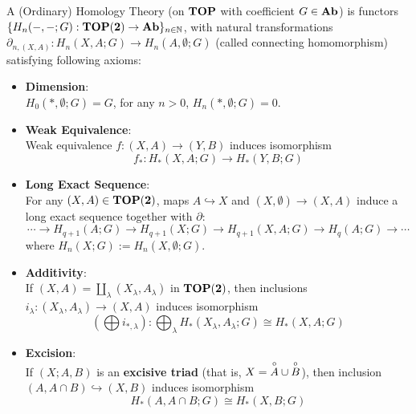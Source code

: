     \begin{defn}
        \label{hyp:Ordinary-Homology-Theory}
        A (Ordinary) Homology Theory (on $\mathbf{TOP}$ with coefficient $G \in \mathbf{Ab}$) is
        functors $\{H_n(-,-;G) : \mathbf{TOP(2)} \to \mathbf{Ab}\}_{n \in \mathbb N}$,
        with natural transformations ${\partial_{n,(X,A)} : H_n(X,A;G) \to H_n(A,\emptyset;G)}$
        (called connecting homomorphism)\\
        satisfying following axioms:\\
        \begin{itemize}
            \item \textbf{Dimension}:\\
                $H_0 (\ast, \emptyset;G) = G$,
                for any $n > 0$, $H_n (\ast, \emptyset;G) = 0$.\\
            \item \textbf{Weak Equivalence}:\\
                Weak equivalence $f : (X,A) \to (Y,B)$
                induces isomorphism
                $$
                f_* : H_*(X,A;G) \to H_*(Y,B;G)
                $$
            \item \textbf{Long Exact Sequence}:\\
                For any $(X,A) \in \mathbf{TOP(2)}$, maps $A \hookrightarrow X$
                and $(X,\emptyset) \to (X,A)$ induce a long exact sequence together
                with $\partial$:
                $$
                \cdots \to H_{q+1}(A;G) \to H_{q+1}(X;G) \to H_{q+1}(X,A;G) \to H_q(A;G) \to \cdots
                $$
                where $H_n(X;G) := H_n(X,\emptyset;G)$.\\
            \item \textbf{Additivity}:\\
                If $(X,A) = \coprod_\lambda (X_\lambda, A_\lambda) $ in $\mathbf{TOP(2)}$,
                then inclusions $i_\lambda : (X_\lambda, A_\lambda) \to (X,A)$
                induces isomorphism
                $$
                (\bigoplus i_{\ast ,\lambda})  : \bigoplus_{\lambda} H_*(X_\lambda,A_\lambda;G) \cong H_*(X,A;G)
                $$
            \item \textbf{Excision}:\\
                If $(X;A,B)$ is an \textbf{excisive triad} (that is, $X = \overset{\circ}{A} \cup \overset{\circ}{B}$),
                then inclusion $(A,A \cap B) \hookrightarrow (X,B)$
                induces isomorphism
                $$
                H_*(A,A\cap B ; G) \cong H_*(X,B;G)
                $$\\
        \end{itemize}

    \end{defn}

